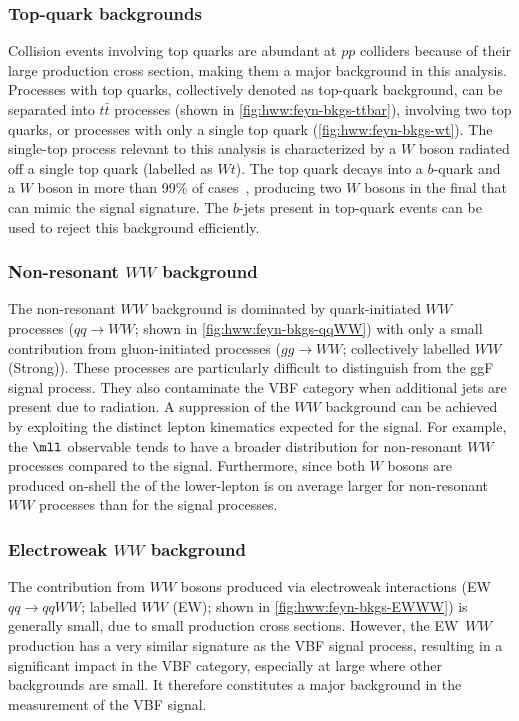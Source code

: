 \subsubsection{Top-quark backgrounds}
Collision events involving top quarks are abundant at $pp$ colliders because of their large production cross section, making them a major background in this analysis.
Processes with top quarks, collectively denoted as top-quark background, can be separated into $t\bar{t}$ processes (shown in \cref{fig:hww:feyn-bkgs-ttbar}), involving two top quarks, or processes with only a single top quark (\cref{fig:hww:feyn-bkgs-wt}). 
The single-top process relevant to this analysis is characterized by a $W$ boson radiated off a single top quark (labelled as $Wt$). 
The top quark decays into a $b$-quark and a $W$ boson in more than 99\% of cases~\cite{PDG2020}, producing two $W$ bosons in the final that can mimic the signal signature. 
The $b$-jets present in top-quark events can be used to reject this background efficiently.

\subsubsection{Non-resonant $WW$ background}
The non-resonant $WW$ background is dominated by quark-initiated $WW$ processes ($qq \to WW$; shown in \cref{fig:hww:feyn-bkgs-qqWW}) with only a small contribution from gluon-initiated processes ($gg \to WW$; collectively labelled $WW$ (Strong)).
These processes are particularly difficult to distinguish from the ggF signal process.
They also contaminate the VBF \TwoJet category when additional jets are present due to radiation. 
A suppression of the $WW$ background can be achieved by exploiting the distinct lepton kinematics expected for the signal. For example, the $\mll$ observable tends to have a broader distribution for non-resonant $WW$ processes compared to the signal. 
Furthermore, since both $W$ bosons are produced on-shell the \pT of the lower-\pT lepton is on average larger for non-resonant $WW$ processes than for the signal processes. 

\subsubsection{Electroweak $WW$ background}
The contribution from $WW$ bosons produced via electroweak interactions (EW $qq \to qqWW$; labelled $WW$ (EW); shown in \cref{fig:hww:feyn-bkgs-EWWW}) is generally small, due to small production cross sections. However, the EW~$WW$ production has a very similar signature as the VBF signal process, resulting in a significant impact in the VBF category, especially at large \mjj where other backgrounds are small. 
It therefore constitutes a major background in the measurement of the VBF signal. 

